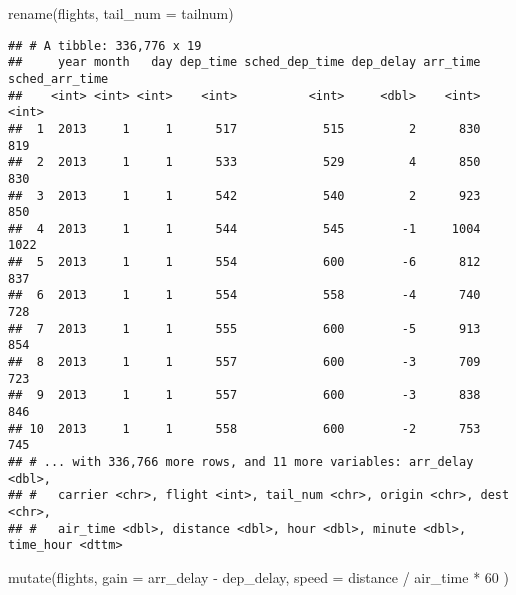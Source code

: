 \documentclass[
]{article}
\newenvironment{Shaded}{\begin{snugshade}}{\end{snugshade}}
\newcommand{\AttributeTok}[1]{\textcolor[rgb]{0.77,0.63,0.00}{#1}}
\newcommand{\DecValTok}[1]{\textcolor[rgb]{0.00,0.00,0.81}{#1}}
\newcommand{\FunctionTok}[1]{\textcolor[rgb]{0.00,0.00,0.00}{#1}}
\newcommand{\NormalTok}[1]{#1}
\newcommand{\SpecialCharTok}[1]{\textcolor[rgb]{0.00,0.00,0.00}{#1}}
\begin{document}
\begin{Shaded}
\begin{Highlighting}[]
\FunctionTok{rename}\NormalTok{(flights, }\AttributeTok{tail\_num =}\NormalTok{ tailnum)}
\end{Highlighting}
\end{Shaded}

\begin{verbatim}
## # A tibble: 336,776 x 19
##     year month   day dep_time sched_dep_time dep_delay arr_time sched_arr_time
##    <int> <int> <int>    <int>          <int>     <dbl>    <int>          <int>
##  1  2013     1     1      517            515         2      830            819
##  2  2013     1     1      533            529         4      850            830
##  3  2013     1     1      542            540         2      923            850
##  4  2013     1     1      544            545        -1     1004           1022
##  5  2013     1     1      554            600        -6      812            837
##  6  2013     1     1      554            558        -4      740            728
##  7  2013     1     1      555            600        -5      913            854
##  8  2013     1     1      557            600        -3      709            723
##  9  2013     1     1      557            600        -3      838            846
## 10  2013     1     1      558            600        -2      753            745
## # ... with 336,766 more rows, and 11 more variables: arr_delay <dbl>,
## #   carrier <chr>, flight <int>, tail_num <chr>, origin <chr>, dest <chr>,
## #   air_time <dbl>, distance <dbl>, hour <dbl>, minute <dbl>, time_hour <dttm>
\end{verbatim}

\begin{Shaded}
\begin{Highlighting}[]
\FunctionTok{mutate}\NormalTok{(flights,}
  \AttributeTok{gain =}\NormalTok{ arr\_delay }\SpecialCharTok{{-}}\NormalTok{ dep\_delay,}
  \AttributeTok{speed =}\NormalTok{ distance }\SpecialCharTok{/}\NormalTok{ air\_time }\SpecialCharTok{*} \DecValTok{60}
\NormalTok{)}
\end{Highlighting}
\end{Shaded}
\end{document}
